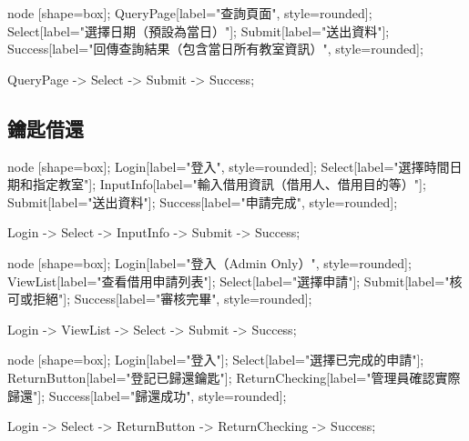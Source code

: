 \documentclass{article}
\begin{document}
\begin{center}

	 {
		node [shape=box];
		QueryPage[label="查詢頁面", style=rounded];
		Select[label="選擇日期（預設為當日）"];
		Submit[label="送出資料"];
		Success[label="回傳查詢結果（包含當日所有教室資訊）", style=rounded];

		QueryPage -> Select -> Submit -> Success;
	}
\end{center}

\pagebreak

\subsection{鑰匙借還}

\begin{center}

	 {
		node [shape=box];
		Login[label="登入", style=rounded];
		Select[label="選擇時間日期和指定教室"];
		InputInfo[label="輸入借用資訊（借用人、借用目的等）"];
		Submit[label="送出資料"];
		Success[label="申請完成", style=rounded];

		Login -> Select -> InputInfo -> Submit -> Success;
	}
\end{center}

\begin{center}

	 {
		node [shape=box];
		Login[label="登入（Admin Only）", style=rounded];
		ViewList[label="查看借用申請列表"];
		Select[label="選擇申請"];
		Submit[label="核可或拒絕"];
		Success[label="審核完畢", style=rounded];

		Login -> ViewList -> Select -> Submit -> Success;
	}

\end{center}

\pagebreak

\begin{center}

	 {
		node [shape=box];
		Login[label="登入"];
		Select[label="選擇已完成的申請"];
		ReturnButton[label="登記已歸還鑰匙"];
		ReturnChecking[label="管理員確認實際歸還"];
		Success[label="歸還成功", style=rounded];

		Login -> Select -> ReturnButton -> ReturnChecking -> Success;
	}
\end{center}
\end{document}
